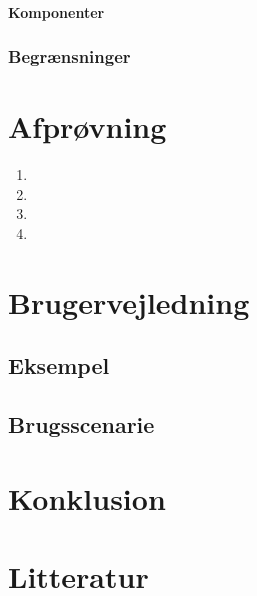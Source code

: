 \documentclass[final]{rapport1}
\begin{document}
\subsubsection{Komponenter}


\subsection{Begrænsninger}

\chapter{Afprøvning}

\begin{enumerate}
\item 
\item 
\item 
\item

\end{enumerate}

\chapter{Brugervejledning}
\section{Eksempel}

\section{Brugsscenarie}

\chapter{Konklusion}

\chapter{Litteratur}
\end{document}
